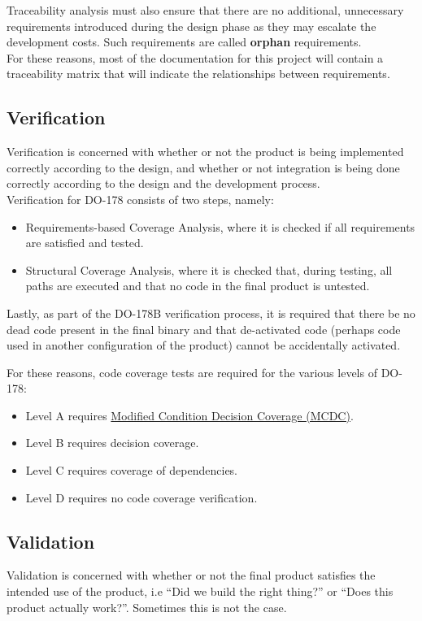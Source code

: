 \documentclass[11pt]{article}
\begin{document}
Traceability analysis must also ensure that there are no additional, unnecessary requirements introduced during the design phase as they may escalate the development costs. Such requirements are called \textbf{orphan} requirements. \\

For these reasons, most of the documentation for this project will contain a traceability matrix that will indicate the relationships between requirements.

\subsection{Verification}\label{subsec:verification}
Verification is concerned with whether or not the product is being implemented correctly according to the design, and whether or not integration is  being done correctly according to the design and the development process. \\

Verification for DO-178 consists of two steps, namely:
\begin{itemize}
\item Requirements-based Coverage Analysis, where it is checked if all requirements are satisfied and tested.
\item Structural Coverage Analysis, where it is checked that, during testing, all paths are executed and that no code in the final product is untested.
\end{itemize}

Lastly, as part of the DO-178B verification process, it is required that there be no dead code present in the final binary and that de-activated code (perhaps code used in another configuration of the product) cannot be accidentally activated.

For these reasons, code coverage tests are required for the various levels of DO-178:
\begin{itemize}
\item Level A requires \href{https://en.wikipedia.org/wiki/Modified_condition/decision_coverage}{Modified Condition Decision Coverage (MCDC)}.
\item Level B requires decision coverage.
\item Level C requires coverage of dependencies.
\item Level D requires no code coverage verification.
\end{itemize}

\subsection{Validation}
Validation is concerned with whether or not the final product satisfies the intended use of the product, i.e \enquote{Did we build the right thing?} or \enquote{Does this product actually work?}. Sometimes this is not the case.
\end{document}
